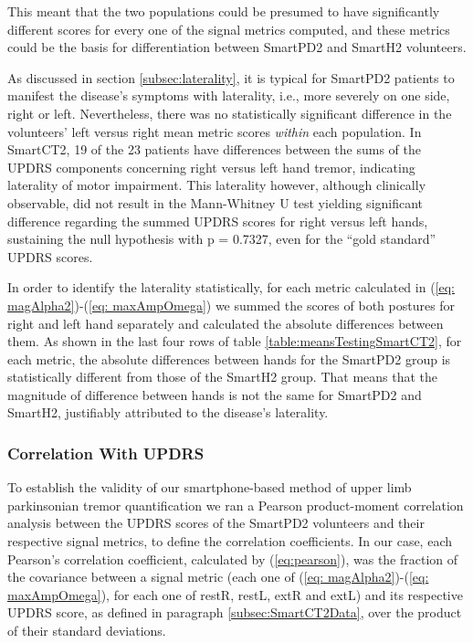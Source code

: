 This meant that the two populations could be presumed to have significantly different scores for every one of the signal metrics computed, and these metrics could be the basis for differentiation between \gls{SmartPD2} and \gls{SmartH2} volunteers.

As discussed in section \ref{subsec:laterality}, it is typical for \gls{SmartPD2} patients to manifest the disease's symptoms with laterality, i.e., more severely on one side, right or left. Nevertheless, there was no statistically significant difference in the volunteers' left versus right mean metric scores \textit{within} each population. In \gls{SmartCT2}, 19 of the 23 patients have differences between the sums of the \gls{UPDRS} components concerning right versus left hand tremor, indicating laterality of motor impairment. This laterality however, although clinically observable, did not result in the Mann-Whitney U test yielding significant difference regarding the summed \gls{UPDRS} scores for right versus left hands, sustaining the null hypothesis with p = 0.7327, even for the ``gold standard'' \gls{UPDRS} scores. 

In order to identify the laterality statistically, for each metric calculated in (\ref{eq: magAlpha2})-(\ref{eq: maxAmpOmega}) we summed the scores of both postures for right and left hand separately and calculated the absolute differences between them. As shown in the last four rows of table \ref{table:meansTestingSmartCT2}, for each metric, the absolute differences between hands for the \gls{SmartPD2} group is statistically different from those of the \gls{SmartH2} group. That means that the magnitude of difference between hands is not the same for \gls{SmartPD2} and \gls{SmartH2}, justifiably attributed to the disease's laterality. 

\subsubsection{Correlation With UPDRS}
\label{subsubsec:SmartCT2Correlation}
To establish the validity of our smartphone-based method of upper limb parkinsonian tremor quantification we ran a Pearson product-moment correlation analysis between the \gls{UPDRS} scores of the \gls{SmartPD2} volunteers and their respective signal metrics, to define the correlation coefficients. In our case, each Pearson's correlation coefficient, calculated by (\ref{eq:pearson}), was the fraction of the covariance between a signal metric (each one of (\ref{eq: magAlpha2})-(\ref{eq: maxAmpOmega}), for each one of restR, restL, extR and extL) and its respective \gls{UPDRS} score, as defined in paragraph \ref{subsec:SmartCT2Data}, over the product of their standard deviations. 

